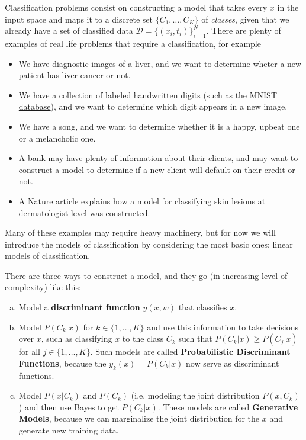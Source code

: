 \documentclass{report}
\begin{document}
Classification problems consist on constructing a model that takes every $x$ in the input space and maps it to a discrete set $\{C_1,\dots, C_K\}$ of \textit{classes}, given that we already have a set of classified data $\mathcal{D} = \{(x_i, t_i)\}_{i=1}^N$. There are plenty of examples of real life problems that require a classification, for example
\begin{itemize}
	\item We have diagnostic images of a liver, and we want to determine wheter a new patient has liver cancer or not.

	\item We have a collection of labeled handwritten digits (such as \href{http://yann.lecun.com/exdb/mnist/}{the MNIST database}), and we want to determine which digit appears in a new image.

	\item We have a song, and we want to determine whether it is a happy, upbeat one or a melancholic one.

	\item A bank may have plenty of information about their clients, and may want to construct a model to determine if a new client will default on their credit or not.

	\item \href{https://cs.stanford.edu/people/esteva/nature/}{A Nature article} explains how a model for classifying skin lesions at dermatologist-level was constructed.
\end{itemize}

Many of these examples may require heavy machinery, but for now we will introduce the models of classification by considering the most basic ones: linear models of classification.

There are three ways to construct a model, and they go (in increasing level of complexity) like this:

\begin{enumerate}[(a)]
	\item Model a \textbf{discriminant function} $y(x,w)$ that classifies $x$.

	\item Model $P(C_k|x)$ for $k\in\{1,\dots,K\}$ and use this information to take decisions over $x$, such as classifying $x$ to the class $C_k$ such that $P(C_k|x) \geq P(C_j|x)$ for all $j\in\{1,\dots, K\}$. Such models are called \textbf{Probabilistic Discriminant Functions}, because the $y_k(x) = P(C_k|x)$ now serve as discriminant functions.

	\item Model $P(x|C_k)$ and $P(C_k)$ (i.e. modeling the joint distribution $P(x, C_k)$) and then use Bayes to get $P(C_k|x)$. These models are called \textbf{Generative Models}, because we can marginalize the joint distribution for the $x$ and generate new training data.
\end{enumerate}
\end{document}

